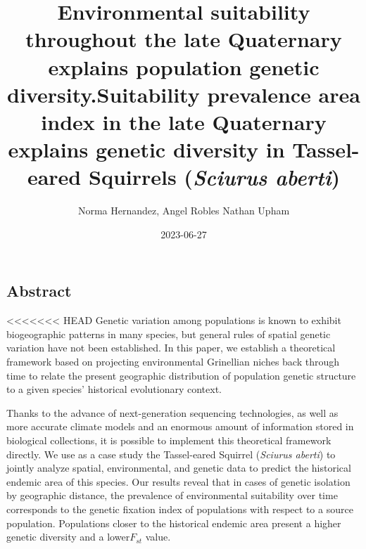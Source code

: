 \documentclass[
]{article}
\title{Environmental suitability throughout the late Quaternary explains
population genetic diversity.}
\title{Suitability prevalence area index in the late Quaternary explains genetic diversity in Tassel-eared Squirrels (\textit{Sciurus aberti})}
\author{Norma Hernandez, Angel Robles Nathan Upham}
\date{2023-06-27}
\begin{document}
\maketitle

\hypertarget{abstract}{%
\subsection{Abstract}\label{abstract}}

<<<<<<< HEAD
Genetic variation among populations is known to exhibit biogeographic
patterns in many species, but general rules of spatial genetic variation
have not been established. In this paper, we establish a theoretical
framework based on projecting environmental Grinellian niches back
through time to relate the present geographic distribution of population
genetic structure to a given species' historical evolutionary context.

Thanks to the advance of next-generation sequencing technologies, as
well as more accurate climate models and an enormous amount of
information stored in biological collections, it is possible to
implement this theoretical framework directly. We use as a case study
the Tassel-eared Squirrel (\emph{Sciurus aberti}) to jointly analyze
spatial, environmental, and genetic data to predict the historical
endemic area of this species. Our results reveal that in cases of
genetic isolation by geographic distance, the prevalence of
environmental suitability over time corresponds to the genetic fixation
index of populations with respect to a source population. Populations
closer to the historical endemic area present a higher genetic diversity
and a lower\(F_{st}\) value.
\end{document}

